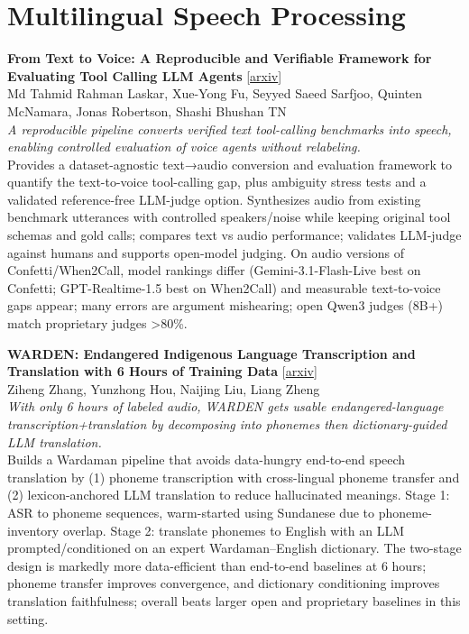 \documentclass[12pt,letterpaper]{article}
\begin{document}
\medskip


\section*{Multilingual Speech Processing}

{\small\textbf{From Text to Voice: A Reproducible and Verifiable Framework for Evaluating Tool Calling LLM Agents}} {\scriptsize[\href{https://arxiv.org/abs/2605.15104}{arxiv}]}\\
{\scriptsize Md Tahmid Rahman Laskar, Xue-Yong Fu, Seyyed Saeed Sarfjoo, Quinten McNamara, Jonas Robertson, Shashi Bhushan TN}\\

{\small\textit{A reproducible pipeline converts verified text tool-calling benchmarks into speech, enabling controlled evaluation of voice agents without relabeling.}}\\[1pt]
{\footnotesize Provides a dataset-agnostic text→audio conversion and evaluation framework to quantify the text-to-voice tool-calling gap, plus ambiguity stress tests and a validated reference-free LLM-judge option. Synthesizes audio from existing benchmark utterances with controlled speakers/noise while keeping original tool schemas and gold calls; compares text vs audio performance; validates LLM-judge against humans and supports open-model judging. On audio versions of Confetti/When2Call, model rankings differ (Gemini-3.1-Flash-Live best on Confetti; GPT-Realtime-1.5 best on When2Call) and measurable text-to-voice gaps appear; many errors are argument mishearing; open Qwen3 judges (8B+) match proprietary judges >80\%.}

\medskip

{\small\textbf{WARDEN: Endangered Indigenous Language Transcription and Translation with 6 Hours of Training Data}} {\scriptsize[\href{https://arxiv.org/abs/2605.13846}{arxiv}]}\\
{\scriptsize Ziheng Zhang, Yunzhong Hou, Naijing Liu, Liang Zheng}\\

{\small\textit{With only 6 hours of labeled audio, WARDEN gets usable endangered-language transcription+translation by decomposing into phonemes then dictionary-guided LLM translation.}}\\[1pt]
{\footnotesize Builds a Wardaman pipeline that avoids data-hungry end-to-end speech translation by (1) phoneme transcription with cross-lingual phoneme transfer and (2) lexicon-anchored LLM translation to reduce hallucinated meanings. Stage 1: ASR to phoneme sequences, warm-started using Sundanese due to phoneme-inventory overlap. Stage 2: translate phonemes to English with an LLM prompted/conditioned on an expert Wardaman--English dictionary. The two-stage design is markedly more data-efficient than end-to-end baselines at 6 hours; phoneme transfer improves convergence, and dictionary conditioning improves translation faithfulness; overall beats larger open and proprietary baselines in this setting.}
\end{document}

